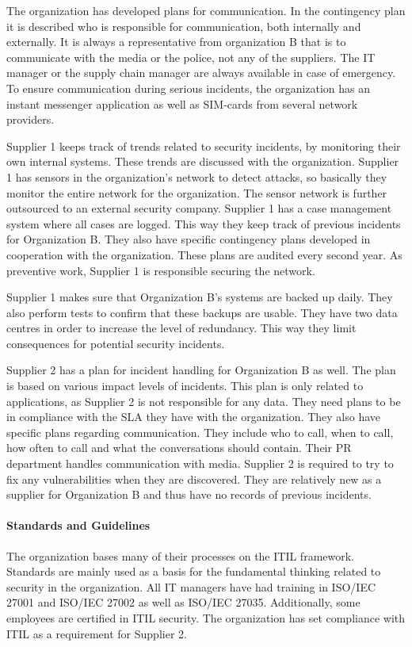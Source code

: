 The organization has developed plans for communication. In the contingency plan it is described who is responsible for communication, both internally and externally. It is always a representative from organization B that is to communicate with the media or the police, not any of the suppliers. The IT manager or the supply chain manager are always available in case of emergency. To ensure communication during serious incidents, the organization has an instant messenger application as well as SIM-cards from several network providers. 

Supplier 1 keeps track of trends related to security incidents, by monitoring their own internal systems. These trends are discussed with the organization. Supplier 1 has sensors in the organization's network to detect attacks, so basically they monitor the entire network for the organization. The sensor network is further outsourced to an external security company. Supplier 1 has a case management system where all cases are logged. This way they keep track of previous incidents for Organization B. They also have specific contingency plans developed in cooperation with the organization. These plans are audited every second year. As preventive work, Supplier 1 is responsible securing the network.

Supplier 1 makes sure that Organization B's systems are backed up daily. They also perform tests to confirm that these backups are usable. They have two data centres in order to increase the level of redundancy. This way they limit consequences for potential security incidents.

Supplier 2 has a plan for incident handling for Organization B as well. The plan is based on various impact levels of incidents. This plan is only related to applications, as Supplier 2 is not responsible for any data. They need plans to be in compliance with the \ac{SLA} they have with the organization. They also have specific plans regarding communication. They include who to call, when to call, how often to call and what the conversations should contain. Their PR department handles communication with media. Supplier 2 is required to try to fix any vulnerabilities when they are discovered. They are relatively new as a supplier for Organization B and thus have no records of previous incidents.

\paragraph{Standards and Guidelines}
The organization bases many of their processes on the ITIL framework. Standards are mainly used as a basis for the fundamental thinking related to security in the organization. All IT managers have had training in ISO/IEC 27001 and ISO/IEC 27002 as well as ISO/IEC 27035. Additionally, some employees are certified in ITIL security. The organization has set compliance with \ac{ITIL} as a requirement for Supplier 2. %

